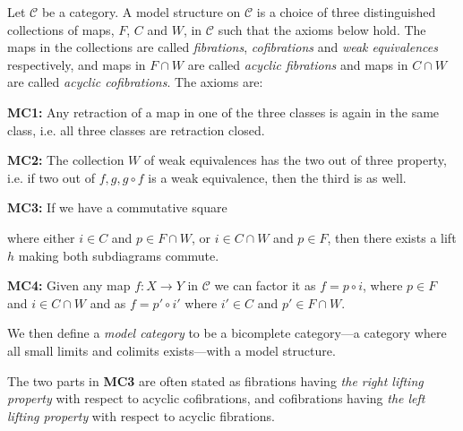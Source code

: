 \begin{definition}
\label{def:model_structure}
Let $\mathcal{C}$ be a category. A model structure on $\mathcal{C}$ is a choice of three distinguished collections of maps, $F$, $C$ and $W$, in $\mathcal{C}$
such that the axioms below hold. The maps in the collections are called \emph{fibrations}, \emph{cofibrations} and \emph{weak equivalences} respectively, and maps in $F\cap W$ are called \emph{acyclic fibrations} and maps in $C\cap W$ are called \emph{acyclic cofibrations}. The axioms are:

\textbf{MC1:}
Any retraction of a map in one of the three classes is again in the same class, i.e. all three classes are retraction closed. 

\textbf{MC2:}
The collection $W$ of weak equivalences has the two out of three property, i.e. if two out of $f, g, g\circ f$ is a weak equivalence, then the third is as well.

\textbf{MC3:}
If we have a commutative square 

\begin{center}
\end{center}

where either $i\in C$ and $p\in F\cap W$, or $i\in C\cap W$ and $p\in F$, then there exists a lift $h$ making both subdiagrams commute.

\textbf{MC4:}
Given any map $f:X\longrightarrow Y$ in $\mathcal{C}$ we can factor it as $f=p\circ i$, where $p\in F$ and $i\in C\cap W$ and as $f=p'\circ i'$ where $i'\in C$ and $p'\in F\cap W$. 
\end{definition}

We then define a \emph{model category} to be a bicomplete category---a category where all small limits and colimits exists---with a model structure. 

The two parts in \textbf{MC3} are often stated as fibrations having \emph{the right lifting property} with respect to acyclic cofibrations, and cofibrations having \emph{the left lifting property} with respect to acyclic fibrations. 


